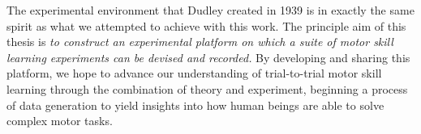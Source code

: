 \documentclass[../main.tex]{subfiles}
\begin{document}
The experimental environment that Dudley created in 1939 is in exactly the same spirit as what we attempted to achieve with this work. The principle aim of this thesis is \textit{to construct an experimental platform on which a suite of motor skill learning experiments can be devised and recorded.} By developing and sharing this platform, we hope to advance our understanding of trial-to-trial motor skill learning through the combination of theory and experiment, beginning a process of data generation to yield insights into how human beings are able to solve complex motor tasks.




\end{document}

